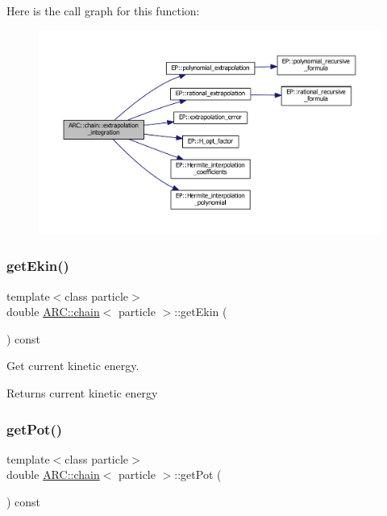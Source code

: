 Here is the call graph for this function\+:
\nopagebreak
\begin{figure}[H]
\begin{center}
\leavevmode
\includegraphics[width=350pt]{classARC_1_1chain_a0eb7768cb1b9099bbf66124d4c00164c_cgraph}
\end{center}
\end{figure}
\hypertarget{classARC_1_1chain_ad7e8b3a20521f095a6935845f8a2ee53}{}\label{classARC_1_1chain_ad7e8b3a20521f095a6935845f8a2ee53} 
\subsubsection{\texorpdfstring{get\+Ekin()}{getEkin()}}
{\footnotesize\ttfamily template$<$class particle$>$ \\
double \hyperlink{classARC_1_1chain}{A\+R\+C\+::chain}$<$ particle $>$\+::get\+Ekin (\begin{DoxyParamCaption}{ }\end{DoxyParamCaption}) const\hspace{0.3cm}{\ttfamily [inline]}}



Get current kinetic energy. 

\begin{DoxyReturn}{Returns}
current kinetic energy 
\end{DoxyReturn}
\hypertarget{classARC_1_1chain_ae59c00c676af34f22c650076eb0aa83a}{}\label{classARC_1_1chain_ae59c00c676af34f22c650076eb0aa83a} 
\subsubsection{\texorpdfstring{get\+Pot()}{getPot()}}
{\footnotesize\ttfamily template$<$class particle$>$ \\
double \hyperlink{classARC_1_1chain}{A\+R\+C\+::chain}$<$ particle $>$\+::get\+Pot (\begin{DoxyParamCaption}{ }\end{DoxyParamCaption}) const\hspace{0.3cm}{\ttfamily [inline]}}



